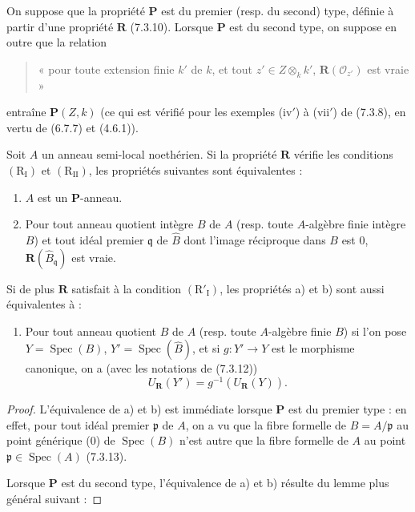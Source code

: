 \begin{proposition}[7.3.16]
\label{IV.2.s7.3.16-fr}
On suppose que la propriété $\boldsymbol P$ est du premier (resp. du
second) type, définie à partir d'une propriété $\boldsymbol R$ (7.3.10).
Lorsque $\boldsymbol P$ est du second type, on suppose en outre que la
relation
\begin{quote}
« pour toute extension finie $k'$ de $k$, et tout
$z'\in Z\otimes_k k'$, $\boldsymbol R(\mathscr O_{z'})$ est vraie »
\end{quote}
entraîne $\boldsymbol P(Z,k)$ (ce qui est vérifié pour les exemples
(iv$'$) à (vii$'$) de (7.3.8), en vertu de (6.7.7) et (4.6.1)).

Soit $A$ un anneau semi-local noethérien. Si la propriété
$\boldsymbol R$ vérifie les conditions $(\mathrm R_{\mathrm I})$ et
$(\mathrm R_{\mathrm{II}})$, les propriétés suivantes sont équivalentes :
\begin{enumerate}
\item[\emph{a)}] $A$ est un $\boldsymbol P$-anneau.
\item[\emph{b)}] Pour tout anneau quotient intègre $B$ de $A$ (resp. toute
$A$-algèbre finie intègre $B$) et tout idéal premier $\mathfrak q$ de
$\widehat B$ dont l'image réciproque dans $B$ est 0,
$\boldsymbol R(\widehat B_{\mathfrak q})$ est vraie.
\end{enumerate}
Si de plus $\boldsymbol R$ satisfait à la condition
$(\mathrm R'_{\mathrm I})$, les propriétés a) et b) sont aussi
équivalentes à :
\begin{enumerate}
\item[\emph{c)}] Pour tout anneau quotient $B$ de $A$ (resp. toute $A$-algèbre finie
$B$) si l'on pose $Y=\operatorname{Spec}(B)$,
$Y'=\operatorname{Spec}(\widehat B)$, et si $g:Y'\to Y$ est le morphisme
canonique, on a (avec les notations de (7.3.12))
\begin{equation}
U_{\boldsymbol R}(Y')=g^{-1}(U_{\boldsymbol R}(Y)).
\tag{7.3.16.1}
\label{IV.2.eq.7.3.16.1-fr}
\end{equation}
\end{enumerate}
\end{proposition}

\begin{proof}
L'équivalence de a) et b) est immédiate lorsque $\boldsymbol P$ est du
premier type : en effet, pour tout idéal premier $\mathfrak p$ de $A$, on
a vu que la fibre formelle de $B=A/\mathfrak p$ au point générique (0) de
$\operatorname{Spec}(B)$ n'est autre que la fibre formelle de $A$ au
point $\mathfrak p\in\operatorname{Spec}(A)$ (7.3.13).

Lorsque $\boldsymbol P$ est du second type, l'équivalence de a) et b)
résulte du lemme plus général suivant :
\end{proof}

